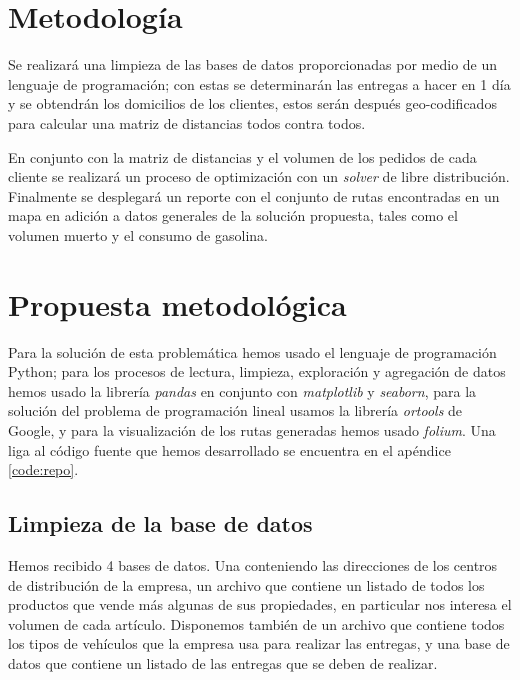 \documentclass[journal]{IEEEtran}
\begin{document}
    \section{Metodología} \label{sec:method}

        Se realizará una limpieza de las bases de datos proporcionadas por medio de un lenguaje de programación; con estas se determinarán las entregas a hacer en 1 día y se obtendrán los domicilios de los clientes, estos serán después geo-codificados para calcular una matriz de distancias todos contra todos.

        En conjunto con la matriz de distancias y el volumen de los pedidos de cada cliente se realizará un proceso de optimización con un \emph{solver} de libre distribución. Finalmente se desplegará un reporte con el conjunto de rutas encontradas en un mapa en adición a datos generales de la solución propuesta, tales como el volumen muerto y el consumo de gasolina.

    \section{Propuesta metodológica} \label{sec:prop-method}
    
        Para la solución de esta problemática hemos usado el lenguaje de programación Python; para los procesos de lectura, limpieza, exploración y agregación de datos hemos usado la librería \emph{pandas} en conjunto con \emph{matplotlib} y \emph{seaborn}, para la solución del problema de programación lineal usamos la librería \emph{ortools} de Google, y para la visualización de los rutas generadas hemos usado \emph{folium}. Una liga al código fuente que hemos desarrollado se encuentra en el apéndice \ref{code:repo}.
        
        \subsection{Limpieza de la base de datos} \label{stage 1}
            
            Hemos recibido 4 bases de datos. Una conteniendo las direcciones de los centros de distribución de la empresa, un archivo que contiene un listado de todos los productos que vende más algunas de sus propiedades, en particular nos interesa el volumen de cada artículo. Disponemos también de un archivo que contiene todos los tipos de vehículos que la empresa usa para realizar las entregas, y una base de datos que contiene un listado de las entregas que se deben de realizar.
            
\end{document}

